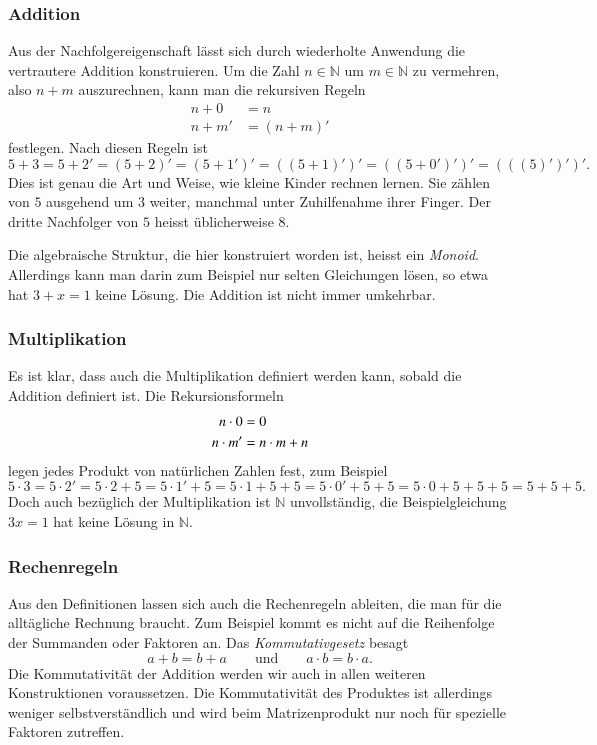 \subsubsection{Addition}
Aus der Nachfolgereigenschaft lässt sich durch wiederholte Anwendung
die vertrautere Addition konstruieren.
%
Um die Zahl $n\in\mathbb{N}$ um $m\in\mathbb{N}$ zu vermehren, also
$n+m$ auszurechnen, kann man die rekursiven Regeln
\begin{align*}
n+0&=n\\
n+m'&=(n+m)'
\end{align*}
festlegen.
Nach diesen Regeln ist
\[
5+3
=
5+2'
=
(5+2)'
=
(5+1')'
=
((5+1)')'
=
((5+0')')'
=
(((5)')')'.
\]
Dies ist genau die Art und Weise, wie kleine Kinder rechnen lernen.
Sie zählen von $5$ ausgehend um $3$ weiter, manchmal unter Zuhilfenahme
ihrer Finger.
Der dritte Nachfolger von $5$ heisst üblicherweise $8$.

Die algebraische Struktur, die hier konstruiert worden ist, heisst
ein {\em Monoid}.
%
Allerdings kann man darin zum Beispiel nur selten Gleichungen
lösen, so etwa hat $3+x=1$ keine Lösung.
Die Addition ist nicht immer umkehrbar.

\subsubsection{Multiplikation}
Es ist klar, dass auch die Multiplikation definiert werden kann, 
sobald die Addition definiert ist.
Die Rekursionsformeln
\begin{align}
n\cdot 0 &= 0 \notag \\
n\cdot m' &= n\cdot m + n
\label{buch:zahlen:multiplikation-rekursion}
\end{align}
legen jedes Produkt von natürlichen Zahlen fest, zum Beispiel
\[
5\cdot 3
=
5\cdot 2'
=
5\cdot 2 + 5
=
5\cdot 1' + 5
=
5\cdot 1 + 5 + 5
=
5\cdot 0' + 5 + 5
=
5\cdot 0 + 5 + 5 + 5
=
5 + 5 + 5.
\]
Doch auch bezüglich der Multiplikation ist $\mathbb{N}$ unvollständig,
die Beispielgleichung $3x=1$ hat keine Lösung in $\mathbb{N}$.

\subsubsection{Rechenregeln}
Aus den Definitionen lassen sich auch die Rechenregeln ableiten,
die man für die alltägliche Rechnung braucht.
Zum Beispiel kommt es nicht auf die Reihenfolge der Summanden
oder Faktoren an. 
Das {\em Kommutativgesetz} besagt
\[
a+b=b+a
\qquad\text{und}\qquad
a\cdot b = b\cdot a.
\]
%
Die Kommutativität der Addition werden wir auch in allen weiteren
Konstruktionen voraussetzen.
Die Kommutativität des Produktes ist allerdings weniger selbstverständlich
und wird beim Matrizenprodukt nur noch für spezielle Faktoren zutreffen.

